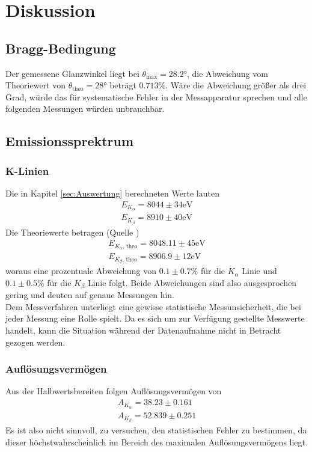 \section{Diskussion}
\label{sec:Diskussion}

\subsection{Bragg-Bedingung}
    Der gemessene Glanzwinkel liegt bei $\theta_{\text{max}} = 28.2 °$, die Abweichung vom Theoriewert von $\theta_{\text{theo}} = 28 °$ beträgt $0.713 \%$.
    Wäre die Abweichung größer als drei Grad, würde das für systematische Fehler in der Messapparatur sprechen und alle folgenden Messungen würden unbrauchbar.

\subsection{Emissionssprektrum}
    \subsubsection{K-Linien}
        Die in Kapitel \ref{sec:Auswertung} berechneten Werte lauten
        \begin{align*}
            E_{K_{\alpha}} = 8044 \pm 34 \text{eV}\\
            E_{K_{\beta}} = 8910 \pm 40 \text{eV}
        \end{align*}
        Die Theoriewerte betragen (Quelle \cite{nist})
        \begin{align*}
            E_{K_{\alpha}\text{, theo}} = 8048.11 \pm 45 \text{eV}\\
            E_{K_{\beta}\text{, theo}} = 8906.9 \pm 12 \text{eV}
        \end{align*}
        woraus eine prozentuale Abweichung von $0.1 \pm 0.7 \%$ für die $K_{\alpha}$ Linie und $0.1 \pm 0.5 \%$ für die $K_{\beta}$ Linie folgt. Beide Abweichungen sind also 
        ausgesprochen gering und deuten auf genaue Messungen hin.\\
        Dem Messverfahren unterliegt eine gewisse statistische Messunsicherheit, die bei jeder Messung eine Rolle spielt. Da es sich um zur Verfügung gestellte Messwerte handelt,
        kann die Situation während der Datenaufnahme nicht in Betracht gezogen werden.

    \subsubsection{Auflösungsvermögen}
        Aus der Halbwertsbereiten folgen Auflösungsvermögen von 
        \begin{align*}
            A_{K_{\alpha}} = 38.23 \pm 0.161 \\
            A_{K_{\beta}} = 52.839 \pm 0.251
        \end{align*}
        Es ist also nicht sinnvoll, zu versuchen, den statistischen Fehler zu bestimmen, da dieser höchstwahrscheinlich im Bereich des maximalen Auflösungsvermögens liegt.
        

